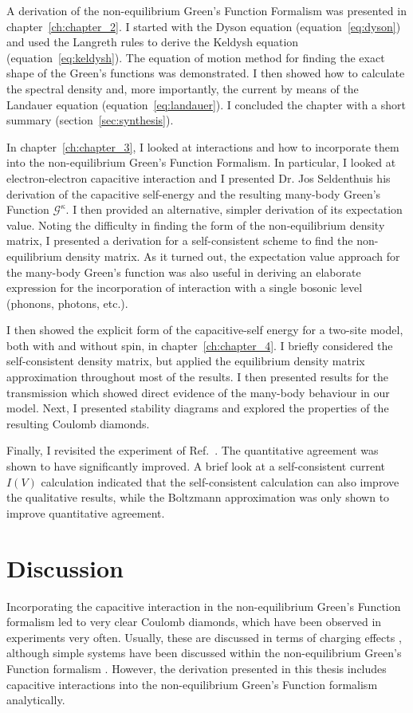 A derivation of the non-equilibrium Green's Function Formalism was presented in chapter~\ref{ch:chapter_2}. I started with the Dyson equation (equation~\ref{eq:dyson}) and used the Langreth rules to derive the Keldysh equation (equation~\ref{eq:keldysh}). The equation of motion method for finding the exact shape of the Green's functions was demonstrated. I then showed how to calculate the spectral density and, more importantly, the current by means of the Landauer equation (equation~\ref{eq:landauer}). I concluded the chapter with a short summary (section~\ref{sec:synthesis}).

In chapter~\ref{ch:chapter_3}, I looked at interactions and how to incorporate them into the non\hyp{}equilibrium Green's Function Formalism. In particular, I looked at electron-electron capacitive interaction and I presented Dr. Jos Seldenthuis his derivation of the capacitive self-energy and the resulting many-body Green's Function $\mathscr{G}^\kappa$. I then provided an alternative, simpler derivation of its expectation value. Noting the difficulty in finding the form of the non-equilibrium density matrix, I presented a derivation for a self-consistent scheme to find the non-equilibrium density matrix. As it turned out, the expectation value approach for the many-body Green's function was also useful in deriving an elaborate expression for the incorporation of interaction with a single bosonic level (phonons, photons, etc.). 

I then showed the explicit form of the capacitive-self energy for a two-site model, both with and without spin, in chapter~\ref{ch:chapter_4}. I briefly considered the self-consistent density matrix, but applied the equilibrium density matrix approximation throughout most of the results. I then presented results for the transmission which showed direct evidence of the many-body behaviour in our model. Next, I presented stability diagrams and explored the properties of the resulting Coulomb diamonds. 

Finally, I revisited the experiment of Ref.~\cite{perrinnano}. The quantitative agreement was shown to have significantly improved. A brief look at a self-consistent current $I(V)$ calc\-ul\-ation indicated that the self-consistent calculation can also improve the qualitative results, while the Boltzmann approximation was only shown to improve quantitative agreement. 

\section{Discussion}
\label{sec:discussion}
Incorporating the capacitive interaction in the non-equilibrium Green's Function formalism led to very clear Coulomb diamonds, which have been observed in experiments very often. Usually, these are discussed in terms of charging effects \cite{seldenthuis, thijszantrev}, although simple systems have been discussed within the non-equilibrium Green's Function formalism \cite{haugjauho}. However, the derivation presented in this thesis includes capacitive interactions into the non-equilibrium Green's Function formalism analytically.

